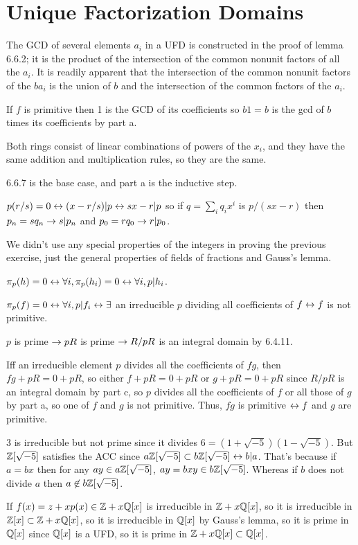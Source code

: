 \documentclass[11pt, oneside]{article}   	%
\begin{document}
\section{Unique Factorization Domains}
\be
\item \be
\item The GCD of several elements $a_i$ in a UFD is constructed in the proof of lemma 6.6.2; it is the product of the intersection of the common nonunit factors of all the $a_i$. It is readily apparent that the intersection of the common nonunit factors of the $ba_i$ is the union of $b$ and the intersection of the common factors of the $a_i$.
\item If $f$ is primitive then 1 is the GCD of its coefficients so $b1 = b$ is the gcd of $b$ times its coefficients by part a.
\ee
\item \be
\item Both rings consist of linear combinations of powers of the $x_i$, and they have the same addition and multiplication rules, so they are the same.
\item 6.6.7 is the base case, and part a is the inductive step.
\ee
\item $p(r/s) = 0 \leftrightarrow (x-r/s) | p \leftrightarrow sx-r | p$ so if $q = \sum_iq_ix^i$ is $p/(sx-r)$ then $p_n = sq_n \rightarrow s|p_n$ and $p_0 = rq_0 \rightarrow r|p_0$.
\item We didn't use any special properties of the integers in proving the previous exercise, just the general properties of fields of fractions and Gauss's lemma.
\item \be
\item $\pi_p(h) = 0 \leftrightarrow \forall i, \pi_p(h_i) = 0 \leftrightarrow \forall i, p | h_i$.
\item $\pi_p(f) = 0 \leftrightarrow \forall i, p | f_i \leftrightarrow \exists$ an irreducible $p$ dividing all coefficients of $f \leftrightarrow f$ is not primitive.
\item $p$ is prime $\rightarrow pR$ is prime $\rightarrow R/pR$ is an integral domain by 6.4.11.
\item Iff an irreducible element $p$ divides all the coefficients of $fg$, then $fg + pR = 0 + pR$, so either $f+pR = 0 + pR$ or $g+ pR = 0 + pR$ since $R/pR$ is an integral domain by part c, so $p$ divides all the coefficients of $f$ or all those of $g$ by part a, so one of $f$ and $g$ is not primitive. Thus, $fg$ is primitive $\leftrightarrow f$ and $g$ are primitive. 
\ee
\item 3 is irreducible but not prime since it divides $6 = (1 + \sqrt{-5})(1- \sqrt{-5})$. But $\mathbb{Z}[\sqrt{-5}]$ satisfies the ACC since $a\mathbb{Z}[\sqrt{-5}] \subset b\mathbb{Z}[\sqrt{-5}] \leftrightarrow b | a$. That's because if $a=bx$ then for any $ay \in a\mathbb{Z}[\sqrt{-5}]$, $ay = bxy \in b\mathbb{Z}[\sqrt{-5}]$. Whereas if $b$ does not divide $a$ then $a \not \in b\mathbb{Z}[\sqrt{-5}]$.
\item If $f(x) = z + xp(x) \in \mathbb{Z} + x\mathbb{Q}[x]$ is irreducible in $\mathbb{Z} + x\mathbb{Q}[x]$, so it is irreducible in $\mathbb{Z}[x] \subset \mathbb{Z} + x\mathbb{Q}[x]$, so it is irreducible in $\mathbb{Q}[x]$ by Gauss's lemma, so it is prime in $\mathbb{Q}[x]$ since $\mathbb{Q}[x]$ is a UFD, so it is prime in $\mathbb{Z} + x\mathbb{Q}[x] \subset \mathbb{Q}[x]$.
\end{document}
